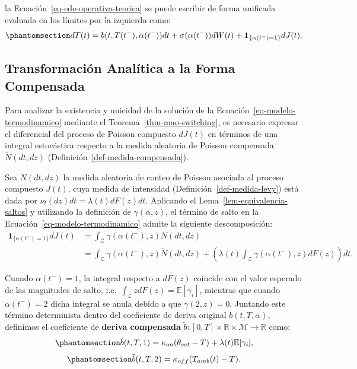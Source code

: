 \documentclass[
  spanish,
  us-letterpaper,
]{scrreprt}
\numberwithin{equation}{section}
\theoremstyle{plain}
\theoremstyle{plain}
\theoremstyle{definition}
\theoremstyle{plain}
\theoremstyle{remark}
\begin{document}
la Ecuación~\ref{eq-ede-operativa-teorica} se puede escribir de forma
unificada evaluada en los límites por la izquierda como:
\begin{equation}\phantomsection\label{eq-modelo-termodinamico}{
dT(t) = b(t, T(t^-), \alpha(t^-)) dt + \sigma(\alpha(t^-)) dW(t) + \mathbf{1}_{\{\alpha(t^-) = 1\}} dJ(t).
}\end{equation}

\subsection{Transformación Analítica a la Forma
Compensada}\label{transformaciuxf3n-analuxedtica-a-la-forma-compensada}

Para analizar la existencia y unicidad de la solución de la
Ecuación~\ref{eq-modelo-termodinamico} mediante el
Teorema~\ref{thm-mao-switching}, es necesario expresar el diferencial
del proceso de Poisson compuesto \(dJ(t)\) en términos de una integral
estocástica respecto a la medida aleatoria de Poisson compensada
\(\tilde{N}(dt, dz)\) (Definición~\ref{def-medida-compensada}).

Sea \(N(dt, dz)\) la medida aleatoria de conteo de Poisson asociada al
proceso compuesto \(J(t)\), cuya medida de intensidad
(Definición~\ref{def-medida-levy}) está dada por
\(\nu_t(dz)dt = \lambda(t)dF(z)dt\). Aplicando el
Lema~\ref{lem-equivalencia-saltos} y utilizando la definición de
\(\gamma(\alpha, z)\), el término de salto en la
Ecuación~\ref{eq-modelo-termodinamico} admite la siguiente
descomposición: \[
\begin{aligned}
\mathbf{1}_{\{\alpha(t^-) = 1\}} dJ(t) &= \int_{\mathcal{Z}} \gamma(\alpha(t^-), z) N(dt, dz) \\
&= \int_{\mathcal{Z}} \gamma(\alpha(t^-), z) \tilde{N}(dt, dz) + \left( \lambda(t) \int_{\mathcal{Z}} \gamma(\alpha(t^-), z) dF(z) \right) dt.
\end{aligned}
\]

Cuando \(\alpha(t^-) = 1\), la integral respecto a \(dF(z)\) coincide
con el valor esperado de las magnitudes de salto,
i.e.~\(\displaystyle \int_{\mathcal{Z}} z dF(z) = \mathbb{E}[\gamma_i]\),
mientras que cuando \(\alpha(t^-) = 2\) dicha integral se anula debido a
que \(\gamma(2, z) = 0\). Juntando este término determinista dentro del
coeficiente de deriva original \(b(t, T, \alpha)\), definimos el
coeficiente de \textbf{deriva compensada}
\(\tilde{b}: [0, T] \times \mathbb{R} \times \mathcal{M} \to \mathbb{R}\)
como: \begin{equation}\phantomsection\label{eq-deriva-compensada-on}{
\tilde{b}(t, T, 1) = \kappa_{on}(\theta_{set} - T) + \lambda(t)\mathbb{E}[\gamma_i],
}\end{equation}
\begin{equation}\phantomsection\label{eq-deriva-compensada-off}{
\tilde{b}(t, T, 2) = \kappa_{off}(T_{amb}(t) - T).
}\end{equation}
\end{document}
